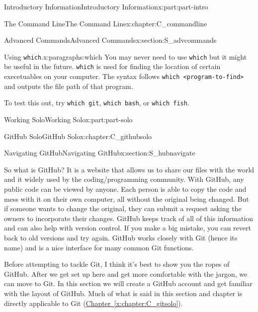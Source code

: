 \documentclass[oneside,10pt,]{book}
\newcommand{\xreffont}{\relax}
\newcommand{\mono}[1]{\texttt{#1}}
\begin{document}
\begin{partptx}{Introductory Information}{}{Introductory Information}{}{}{x:part:part-intro}
\begin{chapterptx}{The Command Line}{}{The Command Line}{}{}{x:chapter:C_commandline}
\begin{sectionptx}{Advanced Commands}{}{Advanced Commands}{}{}{x:section:S_advcommands}
\begin{paragraphs}{Using \mono{which}.}{x:paragraphs:which}
%
%
You may never need to use \mono{which} but it might be useful in the future. \mono{which} is used for finding the location of certain execetuables on your computer. The syntax follows \mono{which <program-to-find>} and outputs the file path of that program.%
\par
To test this out, try \mono{which git}, \mono{which bash}, or \mono{which fish}.%
\end{paragraphs}%
\end{sectionptx}
\end{chapterptx}
\end{partptx}
%
%
\typeout{************************************************}
\typeout{************************************************}
%
\begin{partptx}{Working Solo}{}{Working Solo}{}{}{x:part:part-solo}
%
\typeout{************************************************}
\typeout{************************************************}
%
\begin{chapterptx}{GitHub Solo}{}{GitHub Solo}{}{}{x:chapter:C_githubsolo}
%
%
\typeout{************************************************}
\typeout{************************************************}
%
\begin{sectionptx}{Navigating GitHub}{}{Navigating GitHub}{}{}{x:section:S_hubnavigate}
%
%
\begin{introduction}{}%
So what is GitHub? It is a website that allows us to share our files with the world and it widely used by the coding\slash{}programming community. With GitHub, any public code can be viewed by anyone. Each person is able to copy the code and mess with it on their own computer, all without the original being changed. But if someone wants to change the original, they can submit a request asking the owners to incorporate their changes. GitHub keeps track of all of this information and can also help with version control. If you make a big mistake, you can revert back to old versions and try again. GitHub works closely with Git (hence its name) and is a nice interface for many common Git functions.%
\par
Before attempting to tackle Git, I think it's best to show you the ropes of GitHub. After we get set up here and get more comfortable with the jargon, we can move to Git. In this section we will create a GitHub account and get familiar with the layout of GitHub. Much of what is said in this section and chapter is directly applicable to Git (\hyperref[x:chapter:C_gitsolo]{Chapter~{\xreffont\ref{x:chapter:C_gitsolo}}}).%

\end{introduction}
\end{sectionptx}
\end{chapterptx}
\end{partptx}
\end{document}
